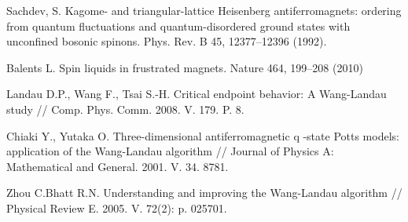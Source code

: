 \begin{thebibliography}{111}
Sachdev, S. Kagome- and triangular-lattice Heisenberg antiferromagnets: ordering from quantum fluctuations and quantum-disordered ground states with unconfined bosonic spinons. Phys. Rev. B 45, 12377--12396 (1992).

Balents L. Spin liquids in frustrated magnets. Nature 464, 199--208 (2010)

Landau D.P., Wang F., Tsai S.-H. Critical endpoint behavior: A Wang-Landau study // Comp. Phys. Comm. 2008. V. 179. P. 8.

Chiaki Y., Yutaka O. Three-dimensional antiferromagnetic q -state Potts models: application of the Wang-Landau algorithm // Journal of Physics A: Mathematical and General. 2001. V. 34. 8781.

Zhou C.Bhatt R.N. Understanding and improving the Wang-Landau algorithm // Physical Review E. 2005. V. 72(2): p. 025701.





\end{thebibliography} 